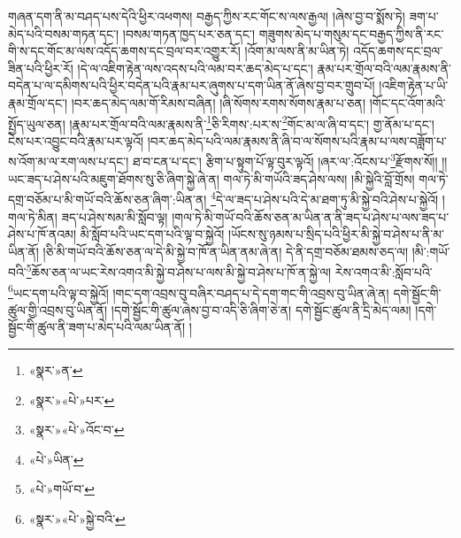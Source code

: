གཞན་དག་ནི་མ་བཤད་པས་དེའི་ཕྱིར་འཕགས། བརྒྱད་ཀྱིས་རང་གོང་ས་ལས་རྒྱལ། །ཞེས་བྱ་བ་སྨོས་ཏེ། ཟག་པ་མེད་པའི་བསམ་གཏན་དང་། །བསམ་གཏན་ཁྱད་པར་ཅན་དང་། གཟུགས་མེད་པ་གསུམ་དང་བརྒྱད་ཀྱིས་ནི་རང་གི་ས་དང་གོང་མ་ལས་འདོད་ཆགས་དང་བྲལ་བར་འགྱུར་རོ། །འོག་མ་ལས་ནི་མ་ཡིན་ཏེ། འདོད་ཆགས་དང་བྲལ་ཟིན་པའི་ཕྱིར་རོ། །དེ་ལ་འཇིག་རྟེན་ལས་འདས་པའི་ལམ་བར་ཆད་མེད་པ་དང་། རྣམ་པར་གྲོལ་བའི་ལམ་རྣམས་ནི་བདེན་པ་ལ་དམིགས་པའི་ཕྱིར་བདེན་པའི་རྣམ་པར་ཞུགས་པ་དག་ཡིན་ནོ་ཞེས་བྱ་བར་གྲུབ་པོ། །འཇིག་རྟེན་པ་ཡི་རྣམ་གྲོལ་དང་། །བར་ཆད་མེད་ལམ་གོ་རིམས་བཞིན། །ཞི་སོགས་རགས་སོགས་རྣམ་པ་ཅན། །གོང་དང་འོག་མའི་སྤྱོད་ཡུལ་ཅན། །རྣམ་པར་གྲོལ་བའི་ལམ་རྣམས་ནི་\footnote{«སྣར་»ན་}ཅི་རིགས་:པར་ས་\footnote{«སྣར་»«པེ་»པར་}གོང་མ་ལ་ཞི་བ་དང་། གྱ་ནོམ་པ་དང་། ངེས་པར་འབྱུང་བའི་རྣམ་པར་ལྟའོ། །བར་ཆད་མེད་པའི་ལམ་རྣམས་ནི་ཞི་བ་ལ་སོགས་པའི་རྣམ་པ་ལས་བཟློག་པ་ས་འོག་མ་ལ་རག་ལས་པ་དང་། ཐ་བ་ངན་པ་དང་། རྩིག་པ་སྟུག་པོ་ལྟ་བུར་ལྟའོ། །ཞར་ལ་:འོངས་པ་\footnote{«སྣར་»«པེ་»འོང་བ་}རྫོགས་སོ།། །།ཡང་ཟད་པ་ཤེས་པའི་མཇུག་ཐོགས་སུ་ཅི་ཞིག་སྐྱེ་ཞེ་ན། གལ་ཏེ་མི་གཡོའི་ཟད་ཤེས་ལས། །མི་སྐྱེའི་བློ་གྲོས། གལ་ཏེ་དགྲ་བཅོམ་པ་མི་གཡོ་བའི་ཆོས་ཅན་ཞིག་:ཡིན་ན། \footnote{«པེ་»ཡིན་}དེ་ལ་ཟད་པ་ཤེས་པའི་དེ་མ་ཐག་ཏུ་མི་སྐྱེ་བའི་ཤེས་པ་སྐྱེའོ། །གལ་ཏེ་མིན། ཟད་པ་ཤེས་སམ་མི་སློབ་ལྟ། །གལ་ཏེ་མི་གཡོ་བའི་ཆོས་ཅན་མ་ཡིན་ན་ནི་ཟད་པ་ཤེས་པ་ལས་ཟད་པ་ཤེས་པ་ཁོ་ནའམ། མི་སློབ་པའི་ཡང་དག་པའི་ལྟ་བ་སྐྱེའོ། །ཡོངས་སུ་ཉམས་པ་སྲིད་པའི་ཕྱིར་མི་སྐྱེ་བ་ཤེས་པ་ནི་མ་ཡིན་ནོ། །ཅི་མི་གཡོ་བའི་ཆོས་ཅན་ལ་དེ་མི་སྐྱེ་བ་ཁོ་ན་ཡིན་ནམ་ཞེ་ན། དེ་ནི་དགྲ་བཅོམ་ཐམས་ཅད་ལ། །མི་:གཡོ་བའི་\footnote{«པེ་»གཡོ་བ་}ཆོས་ཅན་ལ་ཡང་རེས་འགའ་མི་སྐྱེ་བ་ཤེས་པ་ལས་མི་སྐྱེ་བ་ཤེས་པ་ཁོ་ན་སྐྱེ་ལ། རེས་འགའ་མི་:སློབ་པའི་\footnote{«སྣར་»«པེ་»སྐྱེ་བའི་}ཡང་དག་པའི་ལྟ་བ་སྐྱེའོ། །གང་དག་འབྲས་བུ་བཞིར་བཤད་པ་དེ་དག་གང་གི་འབྲས་བུ་ཡིན་ཞེ་ན། དགེ་སྦྱོང་གི་ཚུལ་གྱི་འབྲས་བུ་ཡིན་ནོ། །དགེ་སྦྱོང་གི་ཚུལ་ཞེས་བྱ་བ་འདི་ཅི་ཞིག་ཅེ་ན། དགེ་སྦྱོང་ཚུལ་ནི་དྲི་མེད་ལམ། །དགེ་སྦྱོང་གི་ཚུལ་ནི་ཟག་པ་མེད་པའི་ལམ་ཡིན་ནོ། །
